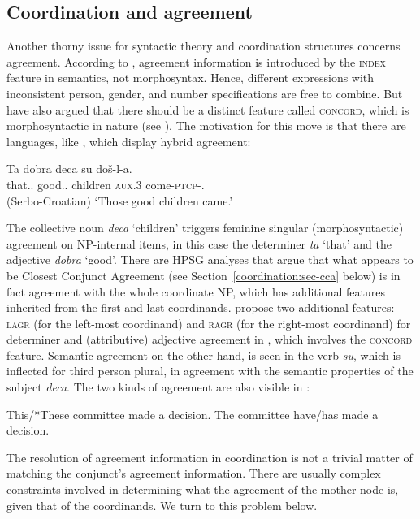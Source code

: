 \subsection{Coordination and agreement}
\label{coordination:sec-agreement}

\largerpage[2]
Another thorny issue for syntactic theory and coordination structures concerns agreement. According to 
\citet[Section~2.4.2]{pollardsag}, agreement information is introduced by the \textsc{index} feature in semantics, not morphosyntax. Hence, different expressions
with inconsistent person, gender, and number specifications are free to combine. But
\citet[Chapter~2]{wechsler} have also argued that there should be a distinct feature called
\textsc{concord}, which is morphosyntactic in nature (see
). The motivation for this
move is that there are languages, like , which display hybrid agreement:

\ea
\gll Ta dobra deca su do\v{s}-l-a.\footnotemark\\
         that.\SG.\F{} good.\SG.\F{} children \textsc{aux}.3\PL{} come-\textsc{ptcp}-\N.\PL\\\hfill(Serbo-Croatian)
\glt `Those good children came.'
\z

\noindent
The collective noun \emph{deca} `children' triggers feminine singular (morphosyntactic) agreement on
NP-internal items, in this case the determiner \emph{ta} `that' and the adjective \emph{dobra}
`good'.  There are  HPSG
analyses that argue that what appears to be Closest Conjunct Agreement (see
Section~\ref{coordination:sec-cca} below) is in fact agreement with
the whole coordinate NP, which has additional features inherited from the first and last
coordinands. \citet[Section~5]{Villavicencio:Sadler:ea:05} propose two additional features:
\textsc{lagr} (for the left-most coordinand) and \textsc{ragr} (for the right-most coordinand) for
determiner and (attributive) adjective agreement in , which involves the
\textsc{concord} feature.  Semantic agreement  on the other hand, is seen in the
verb \emph{su}, which is inflected for third person plural, in agreement with the semantic
properties of the subject \emph{deca}. The two kinds of agreement are also visible in :

\eal
\ex This/*These committee made a decision.
\ex The committee have/has made a decision.
\zl


\noindent
The resolution of agreement information in coordination is not a trivial matter of matching the conjunct's agreement information. There are usually complex constraints involved in determining what the agreement of the mother node is, given that of the coordinands. We turn to this problem below.






